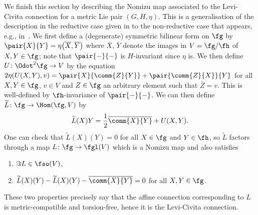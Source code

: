 We finish this section by describing the Nomizu map associated to the Levi-Civita connection for a metric Lie pair $(G,H,\eta)$. This is a generalisation of the description in the reductive case given in \cite{Nomizu1969} to the non-reductive case that appears, e.g., in~\cite{Figueroa-OFarrill2017_1}. We first define a (degenerate) symmetric bilinear form on $\fg$ by $\pair{X}{Y}=\eta\bigl(\overline{X},\overline{Y}\bigr)$ where $\overline{X}$, $\overline{Y}$ denote the images in $V=\fg/\fh$ of $X,Y\in\fg$; note that $\pair{-}{-}$ is $H$-invariant since $\eta$ is. We then define $U\colon \Odot^2\fg\to V$ by the equation
$2\eta(U(X,Y),v) = \pair{X}{\comm{Z}{Y}} + \pair{\comm{Z}{X}}{Y}
$
for all $X,Y\in\fg$, $v\in V$ and $Z\in\fg$ an arbitrary element such that $\overline{Z}=v$. This is well-defined by $\fh$-invariance of $\pair{-}{-}$. We can then define $\widetilde{L}\colon \fg\to\Hom(\fg,V)$ by
\[
	\widetilde{L}(X)Y = \frac{1}{2}\overline{\comm{X}{Y}} + U(X,Y).
\]
One can check that $\widetilde{L}(X)(Y)=0$ for all $X\in\fg$ and $Y\in\fh$, so $\widetilde{L}$ factors through a map $L\colon \fg\to\fgl(V)$ which is a Nomizu map and also satisfies
\begin{enumerate}\itemsep=0pt
	\item $\Im L\in\fso(V)$,
	\item $\widetilde{L}(X)(Y) - \widetilde{L}(X)(Y) - \overline{\comm{X}{Y}} = 0$ for all $X,Y\in \fg$.
\end{enumerate}
These two properties precisely say that the affine connection corresponding to $L$ is metric-compatible and torsion-free, hence it is the Levi-Civita connection.
